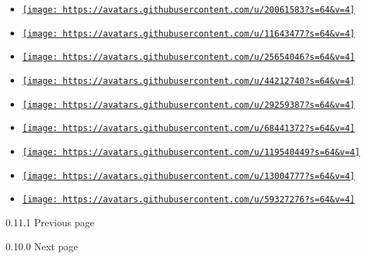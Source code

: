 \begin{itemize}
\item
  \href{https://github.com/t-rapp}{\texttt{[image: https://avatars.githubusercontent.com/u/20061583?s=64\&v=4]}}
\item
  \href{https://github.com/tertsdiepraam}{\texttt{[image: https://avatars.githubusercontent.com/u/11643477?s=64\&v=4]}}
\item
  \href{https://github.com/uetcis}{\texttt{[image: https://avatars.githubusercontent.com/u/25654046?s=64\&v=4]}}
\item
  \href{https://github.com/violetfauna}{\texttt{[image: https://avatars.githubusercontent.com/u/44212740?s=64\&v=4]}}
\item
  \href{https://github.com/voidiz}{\texttt{[image: https://avatars.githubusercontent.com/u/29259387?s=64\&v=4]}}
\item
  \href{https://github.com/xTeamStanly}{\texttt{[image: https://avatars.githubusercontent.com/u/68441372?s=64\&v=4]}}
\item
  \href{https://github.com/xalbd}{\texttt{[image: https://avatars.githubusercontent.com/u/119540449?s=64\&v=4]}}
\item
  \href{https://github.com/xkevio}{\texttt{[image: https://avatars.githubusercontent.com/u/13004777?s=64\&v=4]}}
\item
  \href{https://github.com/zica87}{\texttt{[image: https://avatars.githubusercontent.com/u/59327276?s=64\&v=4]}}
\end{itemize}

\href{/docs/changelog/0.11.1/}{\pandocbounded{}}

{ 0.11.1 } { Previous page }

\href{/docs/changelog/0.10.0/}{\pandocbounded{}}

{ 0.10.0 } { Next page }
